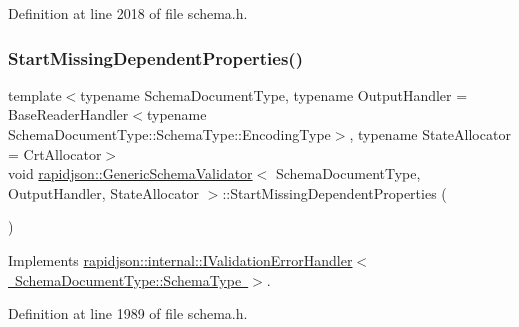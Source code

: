Definition at line 2018 of file schema.\+h.


\begin{DoxyCode}{0}

\end{DoxyCode}
\mbox{\label{classrapidjson_1_1_generic_schema_validator_a4b376874448fc49abb14f88044ea6cde}} 
\subsubsection{\texorpdfstring{StartMissingDependentProperties()}{StartMissingDependentProperties()}}
{\footnotesize\ttfamily template$<$typename Schema\+Document\+Type, typename Output\+Handler = Base\+Reader\+Handler$<$typename Schema\+Document\+Type\+::\+Schema\+Type\+::\+Encoding\+Type$>$, typename State\+Allocator = Crt\+Allocator$>$ \\
void \mbox{\hyperlink{classrapidjson_1_1_generic_schema_validator}{rapidjson\+::\+Generic\+Schema\+Validator}}$<$ Schema\+Document\+Type, Output\+Handler, State\+Allocator $>$\+::Start\+Missing\+Dependent\+Properties (\begin{DoxyParamCaption}{ }\end{DoxyParamCaption})\hspace{0.3cm}{\ttfamily [virtual]}}



Implements \mbox{\hyperlink{classrapidjson_1_1internal_1_1_i_validation_error_handler_aff210754c381fc2c79a3de0be7d7af23}{rapidjson\+::internal\+::\+I\+Validation\+Error\+Handler$<$ Schema\+Document\+Type\+::\+Schema\+Type $>$}}.



Definition at line 1989 of file schema.\+h.


